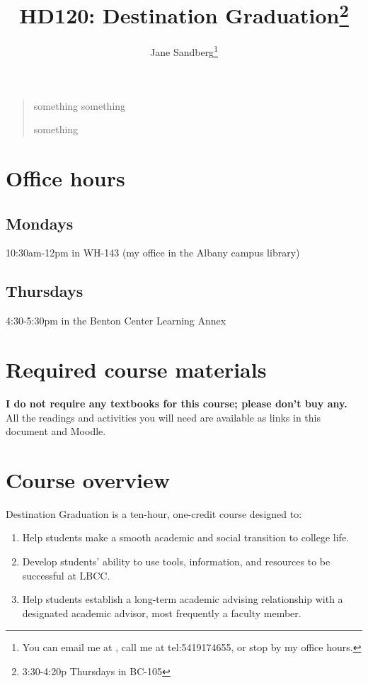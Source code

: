 \documentclass[12pt,article,oneside]{memoir}
\author{Jane Sandberg\thanks{You can email me at \htmladdnormallink{sandbej at linnbenton dot edu}{mailto:sandbej@linnbenton.edu}, call me at \htmladdnormallink{(541) 917 4655}	{tel:5419174655}, or stop by my office hours.}}
\title{HD120: Destination Graduation\thanks{3:30-4:20p Thursdays in BC-105}}
\begin{document}
\renewcommand{\labelitemi}{$\triangleright$}
\setcounter{secnumdepth}{0}
\tightlists


\maketitle


\begin{quotation}
something
something

something 
\end{quotation}

\begin{htmlonly}
\tableofcontents
\end{htmlonly}

\section{Office hours}

\subsection{Mondays}
10:30am-12pm in WH-143 (my office in the Albany campus library)

\subsection{Thursdays}
4:30-5:30pm in the Benton Center Learning Annex

\section{Required course materials}
\textbf{I do not require any textbooks for this course; please don't buy any.}  All the readings and activities you will need are available as links in this document and Moodle.

\section{Course overview}
Destination Graduation is a ten-hour, one-credit course designed to:
\begin{enumerate}
 \item Help students make a smooth academic and social transition to college life.
 \item Develop students' ability to use tools, information, and resources to be successful at LBCC.
 \item Help students establish a long-term academic advising relationship with a designated academic advisor, most frequently a faculty member.
\end{enumerate}
\end{document}
